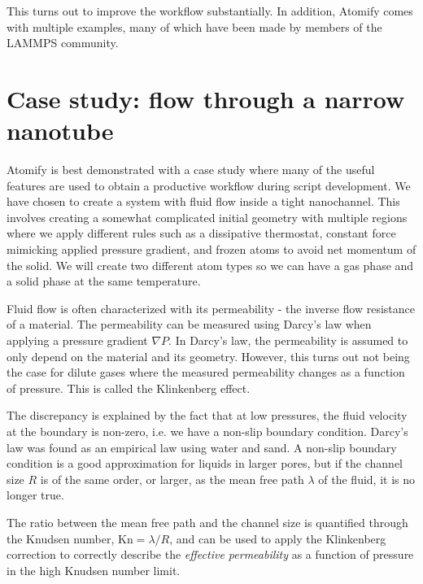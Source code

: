 \documentclass[12pt,a4paper,final]{iopart}
\begin{document}
This turns out to improve the workflow substantially.
In addition, Atomify comes with multiple examples,
many of which have been made by members of the LAMMPS community.

\section{\label{sec:casestudy}Case study: flow through a narrow nanotube}
Atomify is best demonstrated with a case study where many of
the useful features are used to obtain a productive workflow during script development.
We have chosen to create a system with fluid flow inside a tight nanochannel.
This involves creating a somewhat complicated initial geometry with multiple regions
where we apply different rules such as a dissipative thermostat, constant force mimicking
applied pressure gradient, and frozen atoms to avoid net momentum of the solid.
We will create two different atom types so we can have a gas phase and a solid phase at the same temperature.

Fluid flow is often characterized with its permeability - the inverse flow resistance of a material.
The permeability can be measured using Darcy's law when applying a pressure gradient $\nabla P$.
In Darcy's law, the permeability is assumed to only depend on the material and its geometry.
However, this turns out not being the case for dilute
gases where the measured permeability changes as a function of pressure\cite{klinkenberg1941permeability}.
This is called the Klinkenberg effect.

The discrepancy is explained by the fact that at low pressures, the fluid velocity
at the boundary is non-zero, i.e. we have a non-slip boundary condition.
Darcy's law was found as an empirical law using water and sand.
A non-slip boundary condition is a good approximation for liquids in larger pores,
but if the channel size $R$ is of the same order,
or larger, as the mean free path $\lambda$ of the fluid, it is no longer true.

The ratio between the mean free path and the channel size is quantified through
the Knudsen number, $\text{Kn} = \lambda / R$, and can be used to apply the Klinkenberg correction\cite{klinkenberg1941permeability}
to correctly describe the \textit{effective permeability} as a function of pressure in the high Knudsen number limit.
\end{document}

